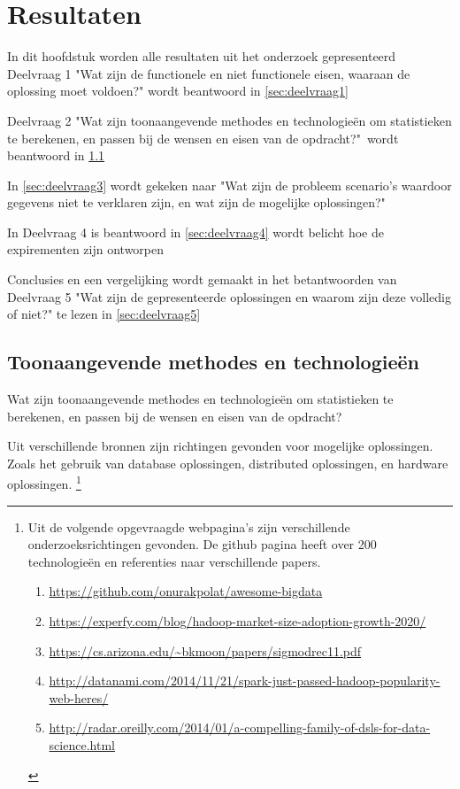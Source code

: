 \chapter{Resultaten}

In dit hoofdstuk worden alle resultaten uit het onderzoek gepresenteerd
Deelvraag 1 "Wat zijn de functionele en niet functionele eisen, waaraan de oplossing moet voldoen?" wordt beantwoord in \ref{sec:deelvraag1}

Deelvraag 2 "Wat zijn toonaangevende methodes en technologieën om statistieken te berekenen, en passen bij de wensen en eisen van de opdracht?"\  wordt beantwoord in \ref{sec:deelvraag2}

In \ref{sec:deelvraag3} wordt gekeken naar "Wat zijn de probleem scenario's waardoor gegevens niet te verklaren zijn, en wat zijn de mogelijke oplossingen?"\ 

In Deelvraag 4 is beantwoord in \ref{sec:deelvraag4} wordt belicht hoe de expirementen zijn ontworpen

Conclusies en een vergelijking wordt gemaakt in het betantwoorden van Deelvraag 5 "Wat zijn de gepresenteerde oplossingen en waarom zijn deze volledig of niet?" te lezen in \ref{sec:deelvraag5}


\clearpage



\clearpage

\section{Toonaangevende methodes en technologieën}
\label{sec:deelvraag2}

Wat zijn toonaangevende methodes en technologieën om statistieken te berekenen, en passen bij de wensen en eisen van de opdracht?

Uit verschillende bronnen zijn richtingen gevonden voor mogelijke oplossingen. Zoals het gebruik van database oplossingen, distributed oplossingen, en hardware oplossingen.
\footnote{
Uit de volgende opgevraagde webpagina's zijn verschillende onderzoeksrichtingen gevonden. De github pagina heeft over 200 technologieën en referenties naar verschillende papers.
\begin{enumerate}
    \item \url{https://github.com/onurakpolat/awesome-bigdata}
    \item \url{https://experfy.com/blog/hadoop-market-size-adoption-growth-2020/}
    \item \url{https://cs.arizona.edu/~bkmoon/papers/sigmodrec11.pdf}
    \item \url{http://datanami.com/2014/11/21/spark-just-passed-hadoop-popularity-web-heres/}
    \item \url{http://radar.oreilly.com/2014/01/a-compelling-family-of-dsls-for-data-science.html}
\end{enumerate}
}


